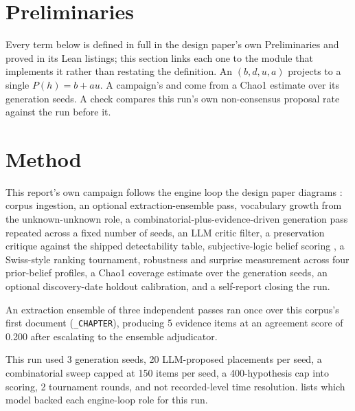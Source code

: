 \documentclass[11pt]{article}
\begin{document}
\section{Preliminaries}
\label{sec:prelim}

Every term below is defined in full in the design paper's own
Preliminaries and proved in its Lean listings; this section links each
one to the module that implements it rather than restating the
definition. An  $(b, d, u, a)$ projects to a
single  $P(h) = b + a u$. A campaign's
 and  come from a Chao1 estimate over its generation seeds. A
 check compares this run's own
non-consensus proposal rate against the run before it.

\section{Method}
\label{sec:method}

This report's own campaign follows the engine loop the design paper diagrams \autocite{bkthte2026design}: corpus ingestion, an optional extraction-ensemble pass, vocabulary growth from the unknown-unknown role, a combinatorial-plus-evidence-driven generation pass repeated across a fixed number of seeds, an LLM critic filter, a preservation critique against the shipped detectability table, subjective-logic belief scoring \autocite{josang2016subjective}, a Swiss-style ranking tournament, robustness and surprise measurement across four prior-belief profiles, a Chao1 coverage estimate over the generation seeds, an optional discovery-date holdout calibration, and a self-report closing the run.

An extraction ensemble of three independent passes ran once over this corpus's first document (\texttt{\_CHAPTER}), producing 5 evidence items at an agreement score of 0.200 after escalating to the ensemble adjudicator.

This run used 3 generation seeds, 20 LLM-proposed placements per seed, a combinatorial sweep capped at 150 items per seed, a 400-hypothesis cap into scoring, 2 tournament rounds, and not recorded-level time resolution.  lists which model backed each engine-loop role for this run.
\end{document}
